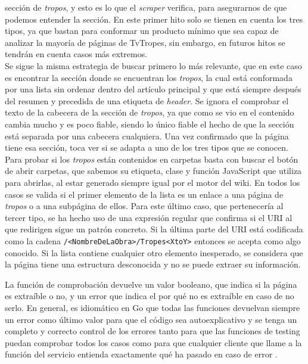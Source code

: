 \begin{itemize}
    sección de \textit{tropos}, y esto es lo que el \textit{scraper} verifica,
    para asegurarnos de que podemos entender la sección. En este primer hito
    solo se tienen en cuenta los tres tipos, ya que bastan para conformar un
    producto mínimo que sea capaz de analizar la mayoría de páginas de TvTropes,
    sin embargo, en futuros hitos se tendrán en cuenta casos más extremos.\\
    Se sigue la misma estrategia de buscar primero lo más relevante, que en este
    caso es encontrar la sección donde se encuentran los \textit{tropos}, la
    cual está conformada por una lista sin ordenar dentro del artículo principal
    y que está siempre después del resumen y precedida de una etiqueta de
    \textit{header}. Se ignora el comprobar el texto de la cabecera de la
    sección de \textit{tropos}, ya que como se vio en \cite{nishalscraping} el
    contenido cambia mucho y es poco fiable, siendo lo único fiable el hecho de
    que la sección está separada por una cabecera cualquiera. Una vez confirmado
    que la página tiene esa sección, toca ver si se adapta a uno de los tres
    tipos que se conocen. Para probar si los \textit{tropos} están contenidos en
    carpetas basta con buscar el botón de abrir carpetas, que sabemos su
    etiqueta, clase y función JavaScript que utiliza para abrirlas, al estar
    generado siempre igual por el motor del wiki. En todos los casos se valida
    si el primer elemento de la lista es un enlace a una página de
    \textit{tropos} o a una subpágina de ellos. Para este último caso, que
    pertenecería al tercer tipo, se ha hecho uso de una expresión regular que
    confirma si el URI al que redirigen sigue un patrón concreto. Si la última
    parte del URI está codificada como la cadena
    \texttt{/<NombreDeLaObra>/Tropes<XtoY>} entonces se acepta como algo
    conocido. Si la lista contiene cualquier otro elemento inesperado, se
    considera que la página tiene una estructura desconocida y no se puede
    extraer su información.
\end{itemize}

La función de comprobación devuelve un valor booleano, que indica si la página
es extraíble o no, y un error que indica el por qué no es extraíble en caso de
no serlo. En general, es idiomático en Go que todas las funciones devuelvan
siempre un error como último valor para que el código sea autoexplicativo y se
tenga un completo y correcto control de los errores tanto para que las funciones
de testing puedan comprobar todos los casos como para que cualquier cliente que
llame a la función del servicio entienda exactamente qué ha pasado en caso de
error \cite{effective_go}.

